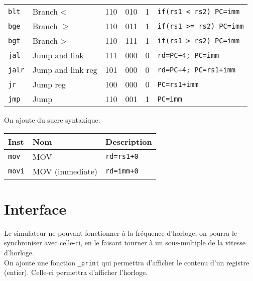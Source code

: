 \documentclass[a4paper]{article}
\begin{document}
\begin{longtable}{|l|l|c|c|c|l|}
        \texttt{blt}   & Branch <                        & 110    & 010    & 1      & \texttt{if(rs1 < rs2) PC=imm} \\
        \texttt{bge}   & Branch \(\geqslant\)            & 110    & 011    & 1      & \texttt{if(rs1 >= rs2) PC=imm}\\
        \texttt{bgt}   & Branch >                        & 110    & 111    & 1      & \texttt{if(rs1 > rs2) PC=imm} \\
        \hline
        \texttt{jal}   & Jump and link                   & 111    & 000    & 0      &\texttt{rd=PC+4; PC=imm}       \\
        \texttt{jalr}  & Jump and link reg               & 101    & 000    & 0      &\texttt{rd=PC+4; PC=rs1+imm}   \\
        \texttt{jr}    & Jump reg                        & 100    & 000    & 0      &\texttt{PC=rs1+imm}            \\
        \texttt{jmp}   & Jump                            & 110    & 001    & 1      &\texttt{PC=imm}                \\
        \hline
    \end{longtable}

    On ajoute du sucre syntaxique:

    \begin{longtable}{|l|l|l|}
        \hline
        Inst          & Nom             & Description       \\
        \hline
        \texttt{mov}  & MOV             & \texttt{rd=rs1+0} \\
        \texttt{movi} & MOV (immediate) & \texttt{rd=imm+0} \\
        \hline
    \end{longtable}
    \section{Interface}
    Le simulateur ne pouvant fonctionner à la fréquence d'horloge, on pourra le synchroniser avec celle-ci, en le faisant tourner à un sous-multiple de la vitesse d'horloge.\\
    On ajoute une fonction \texttt{\_print} qui permettra d'afficher le contenu d'un registre (entier). Celle-ci permettra d'afficher l'horloge.
\end{document}
